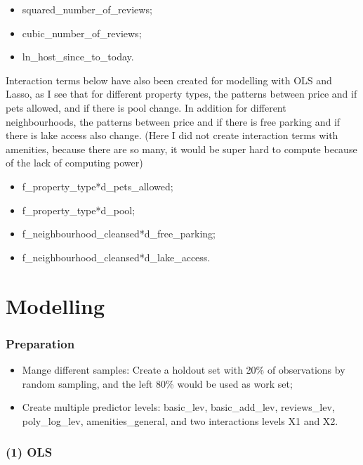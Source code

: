\documentclass[
]{article}
\providecommand{\tightlist}{%
  \setlength{\itemsep}{0pt}\setlength{\parskip}{0pt}}
\begin{document}
\begin{itemize}
\tightlist
\item
  squared\_number\_of\_reviews;
\item
  cubic\_number\_of\_reviews;
\item
  ln\_host\_since\_to\_today.
\end{itemize}

Interaction terms below have also been created for modelling with OLS
and Lasso, as I see that for different property types, the patterns
between price and if pets allowed, and if there is pool change. In
addition for different neighbourhoods, the patterns between price and if
there is free parking and if there is lake access also change. (Here I
did not create interaction terms with amenities, because there are so
many, it would be super hard to compute because of the lack of computing
power)

\begin{itemize}
\tightlist
\item
  f\_property\_type*d\_pets\_allowed;
\item
  f\_property\_type*d\_pool;
\item
  f\_neighbourhood\_cleansed*d\_free\_parking;
\item
  f\_neighbourhood\_cleansed*d\_lake\_access.
\end{itemize}

\hypertarget{modelling}{%
\section{Modelling}\label{modelling}}

\hypertarget{preparation}{%
\subsubsection{Preparation}\label{preparation}}

\begin{itemize}
\tightlist
\item
  Mange different samples: Create a holdout set with 20\% of
  observations by random sampling, and the left 80\% would be used as
  work set;
\item
  Create multiple predictor levels: basic\_lev, basic\_add\_lev,
  reviews\_lev, poly\_log\_lev, amenities\_general, and two interactions
  levels X1 and X2.
\end{itemize}

\hypertarget{ols}{%
\subsubsection{(1) OLS}\label{ols}}
\end{document}
